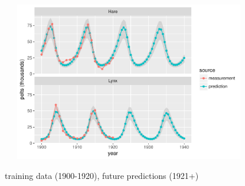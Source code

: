 \documentclass[10pt]{report}
\begin{document}
%
\\[4pt]
\spc \ \ \ \includegraphics[width=0.75\textwidth]{img/lotka-volterra-predict.pdf}
\vspace*{-4pt}
\begin{subsubitemize}
\item training data (1900-1920), future predictions (1921+)
\end{subsubitemize}
\end{document}
